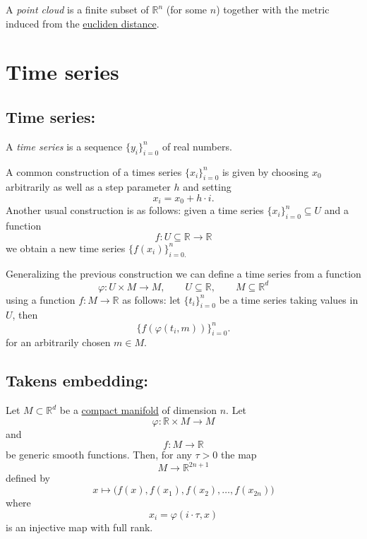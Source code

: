 \documentclass{amsart}
\begin{document}
	A \textit{point cloud} is a finite subset of $\mathbb{R}^n$ (for some $n$) together with the metric induced from the \hyperref[euclidean distance and norm]{eucliden distance}.
	
	\section{Time series}
	
	\subsection*{Time series:} \label{time series}
	
	A \textit{time series} is a sequence $\{y_i\}_{i = 0}^n$ of real numbers. 
	
	A common construction of a times series $\{x_i\}_{i = 0}^n$ is given by choosing $x_0$ arbitrarily as well as a step parameter $h$ and setting
	\begin{equation*}
	x_i = x_0 + h\cdot i.
	\end{equation*}
	Another usual construction is as follows: given a time series $\{x_i\}_{i = 0}^n \subseteq U$ and a function
	\begin{equation*}
	f : U \subseteq \mathbb R \to \mathbb R
	\end{equation*}
	we obtain a new time series $\{f(x_i)\}_{i = 0.}^n$
	
	Generalizing the previous construction we can define a time series from a function 
	\begin{equation*}
	\varphi : U \times M \to M, \qquad U \subseteq \mathbb R, \qquad M \subseteq \mathbb R^d
	\end{equation*} 
	using a function $f : M \to \mathbb R$ as follows: let $\{t_i\}_{i=0}^n$ be a time series taking values in $U$, then
	\begin{equation*}
	\{f(\varphi(t_i, m))\}_{i=0}^n.
	\end{equation*}
	for an arbitrarily chosen $m \in M$.
	
	\subsection*{Takens embedding:}	\label{takens embedding}
	
	Let $M \subset \mathbb R^d$ be a \hyperref[manifold]{compact manifold} of dimension $n$. Let
	\begin{equation*}
	\varphi : \mathbb R \times M \to M
	\end{equation*} 
	and
	\begin{equation*}
	f : M \to \mathbb R
	\end{equation*}
	be generic smooth functions. Then, for any $\tau > 0$ the map
	\begin{equation*}
	M \to \mathbb R^{2n+1}
	\end{equation*}
	defined by
	\begin{equation*}
	x \mapsto\big( f(x), f(x_1), f(x_2), \dots, f(x_{2n}) \big)
	\end{equation*}
	where 
	\begin{equation*}
	x_i = \varphi(i \cdot \tau, x)
	\end{equation*}
	is an injective map with full rank.
	
\end{document}
